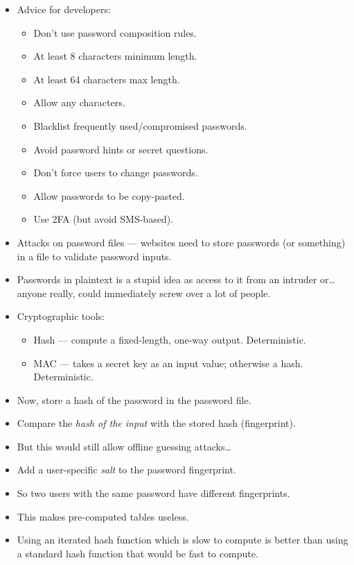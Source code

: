 \documentclass{article}
\begin{document}
\begin{itemize}
    \item Advice for developers:
        \begin{itemize}
            \item Don't use password composition rules.
            \item At least 8 characters minimum length.
            \item At least 64 characters max length.
            \item Allow any characters.
            \item Blacklist frequently used/compromised passwords.
            \item Avoid password hints or secret questions.
            \item Don't force users to change passwords.
            \item Allow passwords to be copy-pasted.
            \item Use 2FA (but avoid SMS-based).
        \end{itemize}
    \item Attacks on password files --- websites need to store passwords (or something) in a file to validate password inputs.
    \item Passwords in plaintext is a stupid idea as access to it from an intruder or\dots anyone really, could immediately screw over a lot of people.
    \item Cryptographic tools:
        \begin{itemize}
            \item Hash --- compute a fixed-length, one-way output.  Deterministic.
            \item MAC --- takes a secret key as an input value; otherwise a hash.  Deterministic.
        \end{itemize}
    \item Now, store a hash of the password in the password file.
    \item Compare the \emph{hash of the input} with the stored hash (fingerprint).
    \item But this would still allow offline guessing attacks\dots
    \item Add a user-specific \emph{salt} to the password fingerprint.
    \item So two users with the same password have different fingerprints.
    \item This makes pre-computed tables useless.
    \item Using an iterated hash function which is slow to compute is better than using a standard hash function that would be fast to compute.

\end{itemize}
\end{document}
